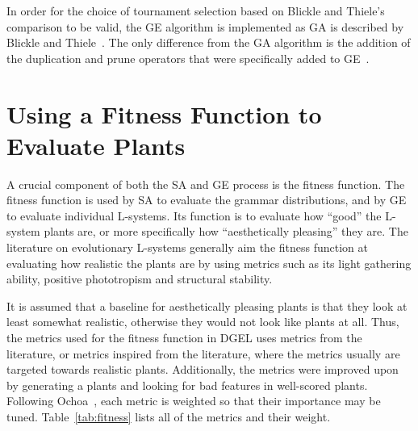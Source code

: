 In order for the choice of tournament selection based on Blickle and Thiele's comparison to be valid, the \gls{GE} algorithm is implemented as \gls{GA} is described by Blickle and Thiele~\cite{1995Blickle}.
The only difference from the \gls{GA} algorithm is the addition of the duplication and prune operators that were specifically added to \gls{GE}~\cite{1998Ryan}.

\section{Using a Fitness Function to Evaluate Plants}
A crucial component of both the \gls{SA} and \gls{GE} process is the fitness function.
The fitness function is used by \gls{SA} to evaluate the grammar distributions, and by \gls{GE} to evaluate individual \glspl{L-system}.
Its function is to evaluate how ``good'' the \gls{L-system} plants are, or more specifically how ``aesthetically pleasing'' they are.
The literature on evolutionary \glspl{L-system} generally aim the fitness function at evaluating how realistic the plants are by using metrics such as its light gathering ability, positive phototropism and structural stability.

It is assumed that a baseline for aesthetically pleasing plants is that they look at least somewhat realistic, otherwise they would not look like plants at all.
Thus, the metrics used for the fitness function in \gls{DGEL} uses metrics from the literature, or metrics inspired from the literature, where the metrics usually are targeted towards realistic plants.
Additionally, the metrics were improved upon by generating a plants and looking for bad features in well-scored plants.
Following Ochoa~\cite{1998Ochoa}, each metric is weighted so that their importance may be tuned.
Table~\ref{tab:fitness} lists all of the metrics and their weight.

